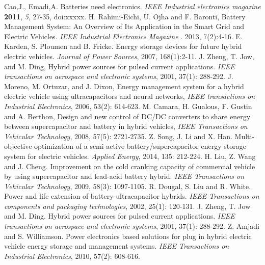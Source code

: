 \documentclass[energies,article,submit,moreauthors,pdftex,10pt,a4paper]{Definitions/mdpi}
\begin{document}
\begin{thebibliography}{999}
Cao,J., Emadi,A. Batteries need electronics. {\em IEEE Industrial electronics magazine} {\bf 2011}, {\em 5}, 27-35, doi:xxxxx.
H. Rahimi-Eichi, U. Ojha and F. Baronti, Battery Management System: An Overview of Its Application in the Smart Grid and Electric Vehicles. {\em IEEE Industrial Electronics Magazine }. 2013, 7(2):4-16.
E. Karden, S. Ploumen and B. Fricke. Energy storage devices for future hybrid electric vehicles. {\em Journal of Power Sources}, 2007, 168(1):2-11.
J. Zheng, T. Jow, and M. Ding, Hybrid power sources for pulsed current applications.  {\em IEEE transactions on aerospace and electronic systems}, 2001, 37(1): 288-292.
J. Moreno, M. Ortuzar, and J. Dixon, Energy management system for a hybrid electric vehicle using ultracapacitors and neural networks, {\em IEEE transactions on Industrial Electronics}, 2006, 53(2): 614-623.
M. Camara, H. Gualous, F. Gustin and A. Berthon, Design and new control of DC/DC converters to share energy between supercapacitor and battery in hybrid vehicles, {\em IEEE Transactions on Vehicular Technology}, 2008, 57(5): 2721-2735.
Z. Song, J. Li and X. Han. Multi-objective optimization of a semi-active battery/supercapacitor energy storage system for electric vehicles. {\em Applied Energy}, 2014, 135: 212-224.
H. Liu, Z. Wang and J. Cheng. Improvement on the cold cranking capacity of commercial vehicle by using supercapacitor and lead-acid battery hybrid. {\em IEEE Transactions on Vehicular Technology}, 2009, 58(3): 1097-1105.
R. Dougal, S. Liu and R. White. Power and life extension of battery-ultracapacitor hybrids. {\em IEEE Transactions on components and packaging technologies}, 2002, 25(1): 120-131.
J. Zheng, T. Jow and M. Ding. Hybrid power sources for pulsed current applications. {\em IEEE transactions on aerospace and electronic systems}, 2001, 37(1): 288-292.
Z. Amjadi and S. Williamson. Power electronics based solutions for plug in hybrid electric vehicle energy storage and management systems. {\em IEEE Transactions on Industrial Electronics}, 2010, 57(2): 608-616.

\end{thebibliography}
\end{document}
